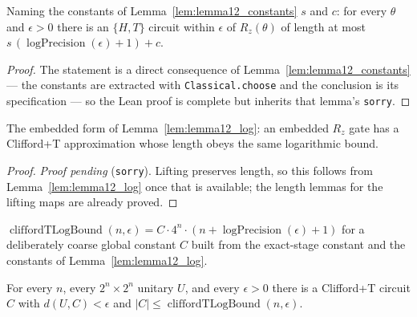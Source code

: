 \begin{lemma}
  \label{lem:lemma12_log}
  \leanok
  Naming the constants of Lemma~\ref{lem:lemma12_constants} $s$ and $c$: for
  every $\theta$ and $\epsilon > 0$ there is an $\{H,T\}$ circuit within
  $\epsilon$ of $R_z(\theta)$ of length at most
  $s\,(\operatorname{logPrecision}(\epsilon)+1)+c$.
\end{lemma}

\begin{proof}
  The statement is a direct consequence of
  Lemma~\ref{lem:lemma12_constants} --- the constants are extracted with
  \texttt{Classical.choose} and the conclusion is its specification --- so the
  Lean proof is complete but inherits that lemma's \texttt{sorry}.
\end{proof}

\begin{lemma}
  \label{lem:rz_embedded_log}
  \leanok
  The embedded form of Lemma~\ref{lem:lemma12_log}: an embedded $R_z$ gate has
  a Clifford+T approximation whose length obeys the same logarithmic bound.
\end{lemma}

\begin{proof}
  \emph{Proof pending} (\texttt{sorry}).  Lifting preserves length, so this
  follows from Lemma~\ref{lem:lemma12_log} once that is available; the length
  lemmas for the lifting maps are already proved.
\end{proof}

\begin{definition}
  \label{def:clifford_t_log_bound}
  \leanok
  $\operatorname{cliffordTLogBound}(n,\epsilon)
     = C\cdot 4^{n}\cdot(n + \operatorname{logPrecision}(\epsilon) + 1)$
  for a deliberately coarse global constant $C$ built from the exact-stage
  constant and the constants of Lemma~\ref{lem:lemma12_log}.
\end{definition}

\begin{theorem}
  \label{thm:clifford_t_log_bounded}
  \leanok
  For every $n$, every $2^n\times 2^n$ unitary $U$, and every $\epsilon > 0$
  there is a Clifford+T circuit $C$ with $d(U,C) < \epsilon$ and
  $\lvert C\rvert \le \operatorname{cliffordTLogBound}(n,\epsilon)$.
\end{theorem}

